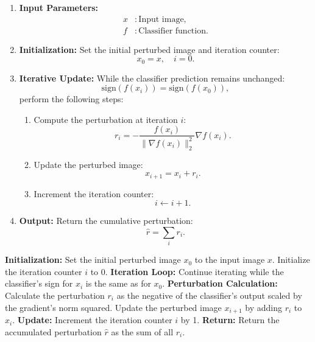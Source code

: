\begin{enumerate}
    \item \textbf{Input Parameters:}  
    \begin{align*}
    x &: \text{Input image}, \\
    f &: \text{Classifier function}.
    \end{align*}

    \item \textbf{Initialization:}  
    Set the initial perturbed image and iteration counter:
    \[
    x_0 = x, \quad i = 0.
    \]

    \item \textbf{Iterative Update:}  
    While the classifier prediction remains unchanged:
    \[
    \text{sign}(f(x_i)) = \text{sign}(f(x_0)),
    \]
    perform the following steps:
    \begin{enumerate}
        \item Compute the perturbation at iteration $i$:
        \[
        r_i = -\frac{f(x_i)}{\|\nabla f(x_i)\|_2^2} \nabla f(x_i).
        \]
        \item Update the perturbed image:
        \[
        x_{i+1} = x_i + r_i.
        \]
        \item Increment the iteration counter:
        \[
        i \gets i + 1.
        \]
    \end{enumerate}

    \item \textbf{Output:}  
    Return the cumulative perturbation:
    \[
    \hat{r} = \sum_i r_i.
    \]
\end{enumerate}


\textbf{Initialization:} 
Set the initial perturbed image $x_0$ to the input image $x$. 
Initialize the iteration counter $i$ to 0.
\textbf{Iteration Loop:} 
Continue iterating while the classifier's sign for $x_i$ is the same as for $x_0$.
\textbf{Perturbation Calculation:}
Calculate the perturbation $r_i$ as the negative of the classifier's output scaled by the gradient's norm squared. 
Update the perturbed image $x_{i+1}$ by adding $r_i$ to $x_i$.
\textbf{Update:} 
Increment the iteration counter $i$ by 1.
\textbf{Return:}
Return the accumulated perturbation $\hat{r}$ as the sum of all $r_i$.





